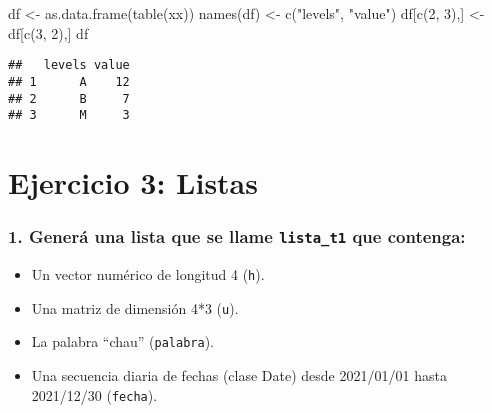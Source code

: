 \documentclass[
]{article}
\newenvironment{Shaded}{\begin{snugshade}}{\end{snugshade}}
\newcommand{\DecValTok}[1]{\textcolor[rgb]{0.00,0.00,0.81}{#1}}
\newcommand{\FunctionTok}[1]{\textcolor[rgb]{0.00,0.00,0.00}{#1}}
\newcommand{\NormalTok}[1]{#1}
\newcommand{\OtherTok}[1]{\textcolor[rgb]{0.56,0.35,0.01}{#1}}
\newcommand{\StringTok}[1]{\textcolor[rgb]{0.31,0.60,0.02}{#1}}
\providecommand{\tightlist}{%
  \setlength{\itemsep}{0pt}\setlength{\parskip}{0pt}}
\begin{document}
\begin{Shaded}
\begin{Highlighting}[]
\NormalTok{df }\OtherTok{\textless{}{-}} \FunctionTok{as.data.frame}\NormalTok{(}\FunctionTok{table}\NormalTok{(xx))}
\FunctionTok{names}\NormalTok{(df) }\OtherTok{\textless{}{-}} \FunctionTok{c}\NormalTok{(}\StringTok{"levels"}\NormalTok{, }\StringTok{"value"}\NormalTok{)}
\NormalTok{df[}\FunctionTok{c}\NormalTok{(}\DecValTok{2}\NormalTok{, }\DecValTok{3}\NormalTok{),] }\OtherTok{\textless{}{-}}\NormalTok{ df[}\FunctionTok{c}\NormalTok{(}\DecValTok{3}\NormalTok{, }\DecValTok{2}\NormalTok{),]}
\NormalTok{df}
\end{Highlighting}
\end{Shaded}

\begin{verbatim}
##   levels value
## 1      A    12
## 2      B     7
## 3      M     3
\end{verbatim}

\newpage

\hypertarget{ejercicio-3-listas}{%
\section{Ejercicio 3: Listas}\label{ejercicio-3-listas}}

\hypertarget{generuxe1-una-lista-que-se-llame-lista_t1-que-contenga}{%
\subsubsection{\texorpdfstring{1. Generá una lista que se llame
\texttt{lista\_t1} que
contenga:}{1. Generá una lista que se llame lista\_t1 que contenga:}}\label{generuxe1-una-lista-que-se-llame-lista_t1-que-contenga}}

\begin{itemize}
\tightlist
\item
  Un vector numérico de longitud 4 (\texttt{h}).
\item
  Una matriz de dimensión 4*3 (\texttt{u}).
\item
  La palabra ``chau'' (\texttt{palabra}).
\item
  Una secuencia diaria de fechas (clase Date) desde 2021/01/01 hasta
  2021/12/30 (\texttt{fecha}).
\end{itemize}
\end{document}

